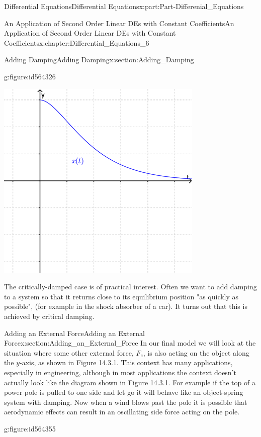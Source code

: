 \documentclass[oneside,10pt,]{book}
\newcommand{\terminology}[1]{\textbf{#1}}
\numberwithin{equation}{section}
\begin{document}
\begin{partptx}{Differential Equations}{}{Differential Equations}{}{}{x:part:Part-Differenial_Equations}
\begin{chapterptx}{An Application of Second Order Linear DEs with Constant Coefficients}{}{An Application of Second Order Linear DEs with Constant Coefficients}{}{}{x:chapter:Differential_Equations_6}
\begin{sectionptx}{Adding Damping}{}{Adding Damping}{}{}{x:section:Adding_Damping}
\begin{figureptx}{}{g:figure:id564326}{}
\begin{image}{0.2}{0.6}{0.2}
\includegraphics[width=\linewidth]{./DifferentialEquations/Images/6/figure_7.png}
\end{image}%
\tcblower
\end{figureptx}%
 The critically-damped case is of practical interest. Often we want to add damping to a system so that it returns close to its equilibrium position "as quickly as possible", (for example in the shock absorber of a car). It turns out that this is achieved by critical damping.%
\end{sectionptx}
%
%
\typeout{************************************************}
\typeout{************************************************}
%
\begin{sectionptx}{Adding an External Force}{}{Adding an External Force}{}{}{x:section:Adding_an_External_Force}
In our final model we will look at the situation where some other external force, \terminology{\(F_e\)}, is also acting on the object along the \(y\)-axis, as shown in Figure 14.3.1. This context has many applications, especially in engineering, although in most applications the context doesn’t actually look like the diagram shown in Figure 14.3.1. For example if the top of a power pole is pulled to one side and let go it will behave like an object-spring system with damping. Now when a wind blows past the pole it is possible that aerodynamic effects can result in an oscillating side force acting on the pole. \begin{figureptx}{}{g:figure:id564355}{}%

\end{figureptx}
\end{sectionptx}
\end{chapterptx}
\end{partptx}
\end{document}
